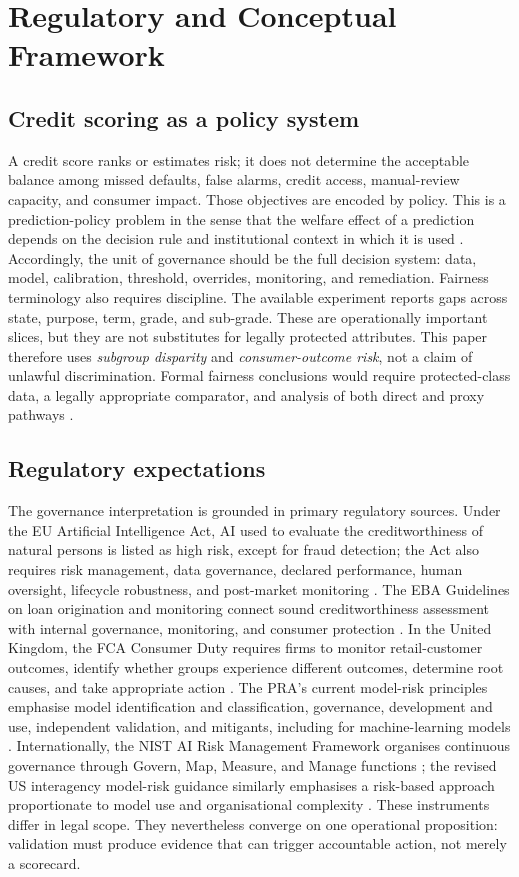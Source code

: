 \documentclass[10pt]{article}
\begin{document}
\section{Regulatory and Conceptual Framework}

\subsection{Credit scoring as a policy system}

A credit score ranks or estimates risk; it does not determine the acceptable balance among missed defaults, false alarms, credit access, manual-review capacity, and consumer impact. Those objectives are encoded by policy. This is a prediction-policy problem in the sense that the welfare effect of a prediction depends on the decision rule and institutional context in which it is used \cite{ref18}. Accordingly, the unit of governance should be the full decision system: data, model, calibration, threshold, overrides, monitoring, and remediation. Fairness terminology also requires discipline. The available experiment reports gaps across state, purpose, term, grade, and sub-grade. These are operationally important slices, but they are not substitutes for legally protected attributes. This paper therefore uses \emph{subgroup disparity} and \emph{consumer-outcome risk}, not a claim of unlawful discrimination. Formal fairness conclusions would require protected-class data, a legally appropriate comparator, and analysis of both direct and proxy pathways \cite{ref8,ref19}.

\subsection{Regulatory expectations}

The governance interpretation is grounded in primary regulatory sources. Under the EU Artificial Intelligence Act, AI used to evaluate the creditworthiness of natural persons is listed as high risk, except for fraud detection; the Act also requires risk management, data governance, declared performance, human oversight, lifecycle robustness, and post-market monitoring \cite{ref40}. The EBA Guidelines on loan origination and monitoring connect sound creditworthiness assessment with internal governance, monitoring, and consumer protection \cite{ref44}. In the United Kingdom, the FCA Consumer Duty requires firms to monitor retail-customer outcomes, identify whether groups experience different outcomes, determine root causes, and take appropriate action \cite{ref46}. The PRA's current model-risk principles emphasise model identification and classification, governance, development and use, independent validation, and mitigants, including for machine-learning models \cite{ref45}. Internationally, the NIST AI Risk Management Framework organises continuous governance through Govern, Map, Measure, and Manage functions \cite{ref39}; the revised US interagency model-risk guidance similarly emphasises a risk-based approach proportionate to model use and organisational complexity \cite{ref47}. These instruments differ in legal scope. They nevertheless converge on one operational proposition: validation must produce evidence that can trigger accountable action, not merely a scorecard.
\end{document}
